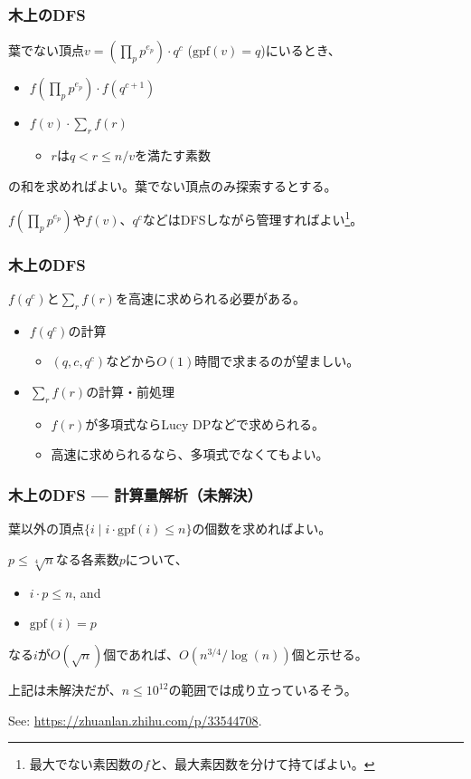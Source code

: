 \documentclass[
  lualatex,
  ja=standard,
  compress,
  hyperref={colorlinks, urlcolor=magenta, linkcolor=blue!55!black},
  dvipsnames,
  svgnames,
]{beamer}
\newcommand{\gpf}[1]{\mathrm{gpf}(#1)}
\begin{document}
\setcounter{slidetopic}{0}
\begin{frame}
  \frametitle{木上のDFS \theslidetopic}

  葉でない頂点$v = (\prod_p p^{e_p})\cdot q^c$ ($\gpf{v}=q$)にいるとき、
  \begin{itemize}
  \item $f(\prod_p p^{e_p})\cdot f(q^{c+1})$
  \item $f(v)\cdot\sum_r f(r)$
    \begin{itemize}
    \item $r$は$q<r\le n/v$を満たす素数
    \end{itemize}
  \end{itemize}
  の和を求めればよい。葉でない頂点のみ探索するとする。

  $f(\prod_p p^{e_p})$や$f(v)$、$q^c$などはDFSしながら管理すればよい\footnote{最大でない素因数の$f$と、最大素因数を分けて持てばよい。}。
\end{frame}

\begin{frame}
  \frametitle{木上のDFS \theslidetopic}

  $f(q^c)$と$\sum_r f(r)$を高速に求められる必要がある。

  \begin{itemize}
  \item $f(q^c)$の計算
    \begin{itemize}
    \item $(q, c, q^c)$などから$O(1)$時間で求まるのが望ましい。
    \end{itemize}
  \item $\sum_r f(r)$の計算・前処理
    \begin{itemize}
    \item $f(r)$が多項式ならLucy DPなどで求められる。
    \item 高速に求められるなら、多項式でなくてもよい。
    \end{itemize}
  \end{itemize}
\end{frame}

\begin{frame}
  \frametitle{木上のDFS \theslidetopic{} — 計算量解析（未解決）}

  葉以外の頂点$\{i\mid i\cdot\gpf{i}\le n\}$の個数を求めればよい。

  $p\le \sqrt[4]{n}$なる各素数$p$について、
  \begin{itemize}
  \item $i\cdot p\le n$, and
  \item $\gpf{i}=p$
  \end{itemize}
  なる$i$が$O(\sqrt{n})$個であれば、$O(n^{3/4}/\log(n))$個と示せる。


  上記は未解決だが、$n\le 10^{12}$の範囲では成り立っているそう。

  See: \url{https://zhuanlan.zhihu.com/p/33544708}.
\end{frame}
\end{document}

